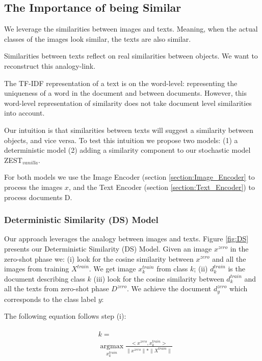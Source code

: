 \documentclass[11pt,a4paper]{article}
\begin{document}
\subsection{The Importance of being Similar}

We leverage the similarities between images and texts. Meaning, when the actual classes of the images look similar, the texts are also similar.

Similarities between texts reflect on real similarities between objects. We want to reconstruct this analogy-link.


The TF-IDF representation of a text is on the word-level: representing the uniqueness of a word in the document and between documents. However, this word-level representation of similarity does not take document level similarities into account. \par

\par

Our intuition is that similarities between texts will suggest a similarity between objects, and vice versa. To test this intuition we propose two models: (1) a deterministic model (2) adding a similarity component to our stochastic model ZEST$_{vanilla}$.

For both models we use the Image Encoder (section \ref{section:Image_Encoder} to process the images $x$, and the Text Encoder (section \ref{section:Text_Encoder}) to process documents D.

\subsubsection{Deterministic Similarity (DS) Model}

Our approach leverages the analogy between images and texts. Figure \ref{fig:DS} presents our Deterministic Similarity (DS) Model. Given an image $x^{zero}$ in the zero-shot phase we: (i) look for the cosine similarity between $x^{zero}$ and all the images from training $X^{train}$. We get image $x_k^{train}$ from class $k$; (ii) $d_k^{train}$ is the document describing class $k$  (iii)
look for the cosine similarity between $d_k^{train}$ and all the texts from zero-shot phase $D^{zero}$. We achieve the document $d_y^{zero}$ which corresponds to the class label $y$:


The following equation follows step (i):

\begin{equation}
\begin{aligned}
\begin{split}
&k= \\
&\operatorname*{argmax}_{x^{train}_k} \frac{<x^{zero},x^{train}_k>}{\| x^{zero}\| *\| X^{train}\| } %
\end{split}
\end{aligned}
\end{equation}
\end{document}
